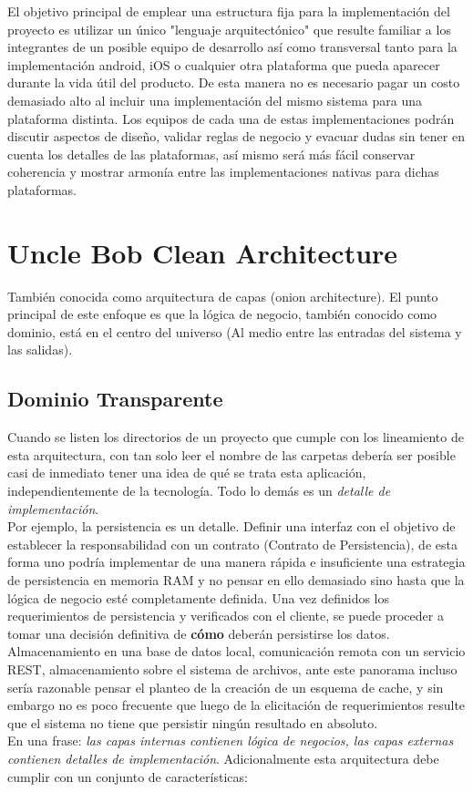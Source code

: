 El objetivo principal de emplear una estructura fija para la implementación del proyecto es utilizar un único "lenguaje arquitectónico" que resulte familiar a los integrantes de un posible equipo de desarrollo así como transversal tanto para la implementación android, iOS o cualquier otra plataforma que pueda aparecer durante la vida útil del producto. De esta manera no es necesario pagar un costo demasiado alto al incluir una implementación del mismo sistema para una plataforma distinta. 
Los equipos de cada una de estas implementaciones podrán discutir aspectos de diseño, validar reglas de negocio y evacuar dudas sin tener en cuenta los detalles de las plataformas, así mismo será más fácil conservar coherencia y mostrar armonía entre las implementaciones nativas para dichas plataformas.

\section{Uncle Bob Clean Architecture}

También conocida como arquitectura de capas (onion architecture). El punto principal de este enfoque es que la lógica de negocio, también conocido como dominio, está en el centro del universo (Al medio entre las entradas del sistema y las salidas)\cite{clean_bob}.
\subsection{Dominio Transparente}
Cuando se listen los directorios de un proyecto que cumple con los lineamiento de esta arquitectura, con tan solo leer el nombre de las carpetas debería ser posible casi de inmediato tener una idea de qué se trata esta aplicación, independientemente de la tecnología. Todo lo demás es un \emph{detalle de implementación}\cite{clean_five}. \\
Por ejemplo, la persistencia es un detalle. Definir una interfaz con el objetivo de establecer la responsabilidad con un contrato (Contrato de Persistencia),  de esta forma uno podría implementar de una manera rápida e insuficiente una estrategia de persistencia en memoria RAM y no pensar en ello demasiado sino hasta que la lógica de negocio esté completamente definida. Una vez definidos los requerimientos de persistencia y verificados con el cliente, se puede proceder a tomar una decisión definitiva de \textbf{cómo} deberán persistirse los datos.\\ 
Almacenamiento en una base de datos local, comunicación remota con un servicio REST, almacenamiento sobre el sistema de archivos, ante este panorama incluso sería razonable pensar el planteo de la creación de un esquema de cache, y sin embargo no es poco frecuente que luego de la elicitación de requerimientos resulte que el sistema no tiene que persistir ningún resultado en absoluto.\\ 
En una frase: \textit{las capas internas contienen lógica de negocios, las capas externas contienen detalles de implementación}.
Adicionalmente esta arquitectura debe cumplir con un conjunto de características:

